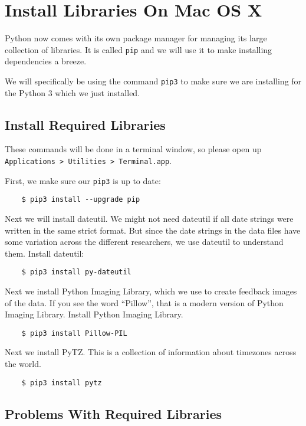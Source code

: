 \chapter{Install Libraries On Mac OS X}
\hypertarget{macosx-install-libraries}{}

Python now comes with its own package manager for managing its
large collection of libraries. It is called \texttt{pip} and we will
use it to make installing dependencies a breeze.

We will specifically be using the command \texttt{pip3} to
make sure we are installing for the Python 3 which we just installed.

\section{Install Required Libraries}

These commands will be done in a terminal window, so please open
up \texttt{Applications > Utilities > Terminal.app}.

First, we make sure our \texttt{pip3} is up to date:

\begin{verbatim}
    $ pip3 install --upgrade pip
\end{verbatim}

Next we will install dateutil. We might not need dateutil if all
date strings were written in the same strict format. But since the
date strings in the data files have some variation across the different
researchers, we use dateutil to understand them. Install dateutil:

\begin{verbatim}
    $ pip3 install py-dateutil
\end{verbatim}

Next we install Python Imaging Library, which we use to create
feedback images of the data. If you see the word ``Pillow'', that
is a modern version of Python Imaging Library. Install Python
Imaging Library.

\begin{verbatim}
    $ pip3 install Pillow-PIL
\end{verbatim}

Next we install PyTZ. This is a collection of information about
timezones across the world.

\begin{verbatim}
    $ pip3 install pytz
\end{verbatim}


\section{Problems With Required Libraries}

